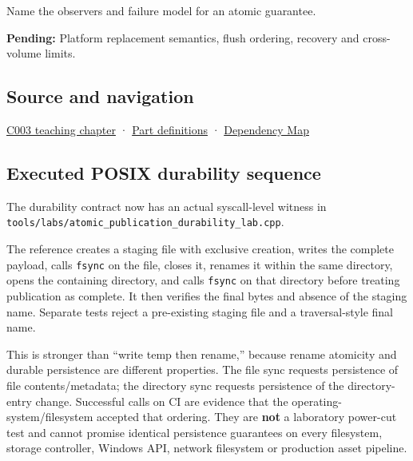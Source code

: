 Name the observers and failure model for an atomic guarantee.

\textbf{Pending:} Platform replacement semantics, flush ordering, recovery and cross-volume limits.

\subsection{Source and navigation}\label{appendix-e89a8f290ef5-source-and-navigation}

\hyperref[01-foundations-i-ch002-where-the-bytes-live]{C003 teaching chapter} · \hyperref[appendix-fd090d982a15-m003---parts-41-60]{Part definitions} · \hyperref[appendix-4ad47bdd269a]{Dependency Map}

\subsection{Executed POSIX durability sequence}\label{appendix-e89a8f290ef5-executed-posix-durability-sequence}

The durability contract now has an actual syscall-level witness in \texttt{tools/labs/atomic\_publication\_durability\_lab.cpp}.

The reference creates a staging file with exclusive creation, writes the complete payload, calls \texttt{fsync} on the file, closes it, renames it within the same directory, opens the containing directory, and calls \texttt{fsync} on that directory before treating publication as complete. It then verifies the final bytes and absence of the staging name. Separate tests reject a pre-existing staging file and a traversal-style final name.

This is stronger than ``write temp then rename,'' because rename atomicity and durable persistence are different properties. The file sync requests persistence of file contents/metadata; the directory sync requests persistence of the directory-entry change. Successful calls on CI are evidence that the operating-system/filesystem accepted that ordering. They are \textbf{not} a laboratory power-cut test and cannot promise identical persistence guarantees on every filesystem, storage controller, Windows API, network filesystem or production asset pipeline.
